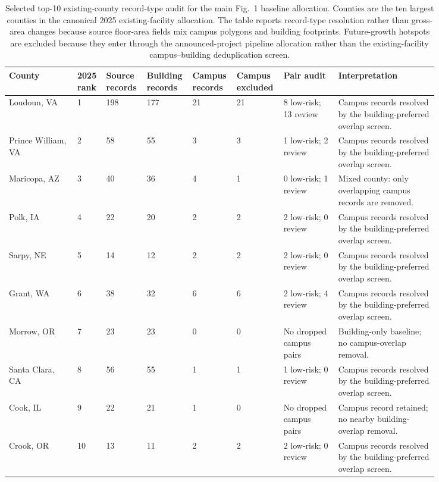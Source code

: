 \begin{table}[H]
\centering
\caption{Selected top-10 existing-county record-type audit for the main Fig.~1 baseline allocation. Counties are the ten largest counties in the canonical 2025 existing-facility allocation. The table reports record-type resolution rather than gross-area changes because source floor-area fields mix campus polygons and building footprints. Future-growth hotspots are excluded because they enter through the announced-project pipeline allocation rather than the existing-facility campus--building deduplication screen.}
\label{tab:top10-existing-record-resolution-audit}
\scriptsize
\setlength{\tabcolsep}{2pt}
\begin{tabular}{@{}L{0.15\linewidth}L{0.055\linewidth}L{0.075\linewidth}L{0.075\linewidth}L{0.07\linewidth}L{0.075\linewidth}L{0.12\linewidth}L{0.22\linewidth}@{}}
\toprule
County & 2025 rank & Source records & Building records & Campus records & Campus excluded & Pair audit & Interpretation \\
\midrule
Loudoun, VA & 1 & 198 & 177 & 21 & 21 & 8 low-risk; 13 review & Campus records resolved by the building-preferred overlap screen. \\
Prince William, VA & 2 & 58 & 55 & 3 & 3 & 1 low-risk; 2 review & Campus records resolved by the building-preferred overlap screen. \\
Maricopa, AZ & 3 & 40 & 36 & 4 & 1 & 0 low-risk; 1 review & Mixed county: only overlapping campus records are removed. \\
Polk, IA & 4 & 22 & 20 & 2 & 2 & 2 low-risk; 0 review & Campus records resolved by the building-preferred overlap screen. \\
Sarpy, NE & 5 & 14 & 12 & 2 & 2 & 2 low-risk; 0 review & Campus records resolved by the building-preferred overlap screen. \\
Grant, WA & 6 & 38 & 32 & 6 & 6 & 2 low-risk; 4 review & Campus records resolved by the building-preferred overlap screen. \\
Morrow, OR & 7 & 23 & 23 & 0 & 0 & No dropped campus pairs & Building-only baseline; no campus-overlap removal. \\
Santa Clara, CA & 8 & 56 & 55 & 1 & 1 & 1 low-risk; 0 review & Campus records resolved by the building-preferred overlap screen. \\
Cook, IL & 9 & 22 & 21 & 1 & 0 & No dropped campus pairs & Campus record retained; no nearby building-overlap removal. \\
Crook, OR & 10 & 13 & 11 & 2 & 2 & 2 low-risk; 0 review & Campus records resolved by the building-preferred overlap screen. \\
\bottomrule
\end{tabular}
\end{table}
